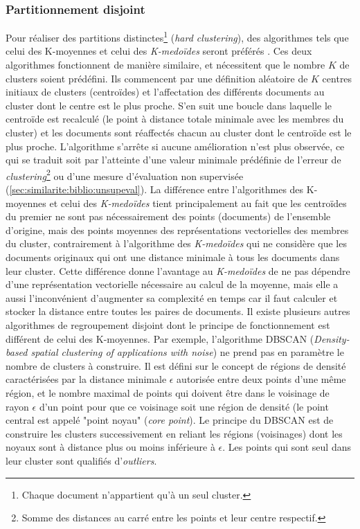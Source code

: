 \subsubsection{Partitionnement disjoint}
Pour réaliser des partitions distinctes\footnote{Chaque document n'appartient qu'à un seul cluster.} (\textit{hard clustering}), des algorithmes tels que celui des K-moyennes \citep{forgey1965kmeans} et celui des \textit{K-medoïdes} \citep{kaufman1987kmedoids} seront préférés \citep{balabantaray2015kmeanskmedoids}. Ces deux algorithmes fonctionnent de manière similaire, et nécessitent que le nombre $K$ de clusters soient prédéfini. Ils commencent par une définition aléatoire de $K$ centres initiaux de clusters (centroïdes) et l'affectation des différents documents au cluster dont le centre est le plus proche. S'en suit une boucle dans laquelle le centroïde est recalculé (le point à distance totale minimale avec les membres du cluster) et les documents sont réaffectés chacun au cluster dont le centroïde est le plus proche. L'algorithme s'arrête si aucune amélioration n'est plus observée, ce qui se traduit soit par l'atteinte d'une valeur minimale prédéfinie de l'erreur de \textit{clustering}\footnote{Somme des distances au carré entre les points et leur centre respectif.} ou d'une mesure d'évaluation non supervisée (\ref{sec:similarite:biblio:unsupeval}). La différence entre l'algorithmes des K-moyennes et celui des \textit{K-medoïdes} tient principalement au fait que les centroïdes du premier ne sont pas nécessairement des points (documents) de l'ensemble d'origine, mais des points moyennes des représentations vectorielles des membres du cluster, contrairement à l'algorithme des \textit{K-medoïdes} qui ne considère que les documents originaux qui ont une distance minimale à tous les documents dans leur cluster. Cette différence donne l'avantage au \textit{K-medoïdes} de ne pas dépendre d'une représentation vectorielle nécessaire au calcul de la moyenne, mais elle a aussi l'inconvénient d'augmenter sa complexité en temps  car il faut calculer et stocker la distance entre toutes les paires de documents. Il existe plusieurs autres algorithmes de regroupement disjoint dont le principe de fonctionnement est différent de celui des K-moyennes. Par exemple, l'algorithme DBSCAN (\textit{Density-based spatial clustering of applications with noise}) \citep{ester1996dbscan}  ne prend pas en paramètre le nombre de clusters à construire. Il est défini sur le concept de régions de densité caractérisées par la distance minimale $\epsilon$ autorisée entre deux points d'une même région, et le nombre maximal de points qui doivent être dans le voisinage de rayon $\epsilon$ d'un point pour que ce voisinage soit une région de densité (le point central est appelé "point noyau" (\textit{core point}). Le principe du DBSCAN est de construire les clusters successivement en reliant les régions (voisinages) dont les noyaux sont à distance plus ou moins inférieure à $\epsilon$. Les points qui sont seul dans leur cluster sont qualifiés d'\textit{outliers}. 
